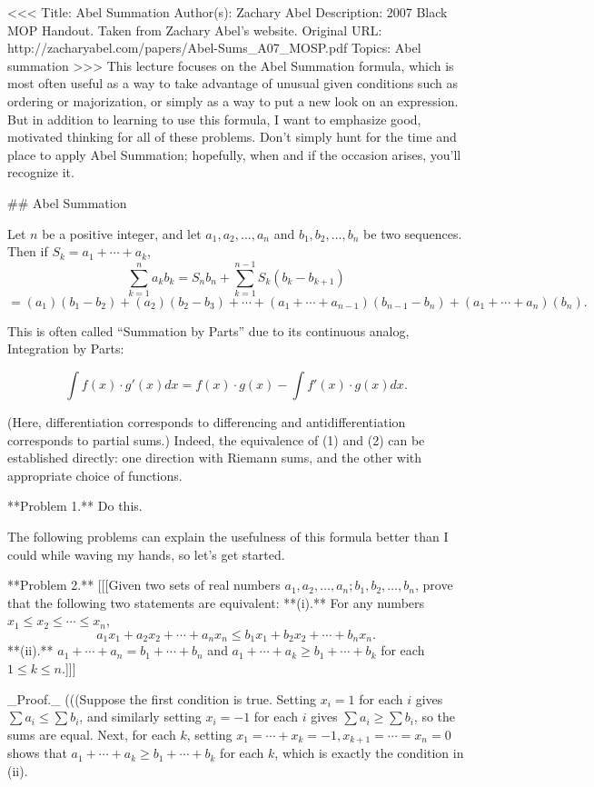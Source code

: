 <<<
Title: Abel Summation
Author(s): Zachary Abel
Description: 2007 Black MOP Handout. Taken from Zachary Abel's website. Original URL: http://zacharyabel.com/papers/Abel-Sums_A07_MOSP.pdf
Topics: Abel summation
>>>
This lecture focuses on the Abel Summation formula, which is most often useful as a way to take advantage
of unusual given conditions such as ordering or majorization, or simply as a way to put a new look on an
expression. But in addition to learning to use this formula, I want to emphasize good, motivated thinking
for all of these problems. Don’t simply hunt for the time and place to apply Abel Summation; hopefully,
when and if the occasion arises, you’ll recognize it.

## Abel Summation

Let $n$ be a positive integer, and let $a_1, a_2, \ldots, a_n$ and $b_1, b_2, \ldots, b_n$ be two sequences. Then if $S_k = a_1 + \cdots + a_k$, 
\[ \sum_{k=1}^n a_k b_k = S_n b_n + \sum_{k=1}^{n-1} S_k (b_k - b_{k+1}) \]
\[ = (a_1) (b_1 - b_2) + (a_2)(b_2 - b_3) + \cdots + (a_1 + \cdots + a_{n-1})(b_{n-1} - b_n) + (a_1 + \cdots + a_n)(b_n). \]

This is often called “Summation by Parts” due to its continuous analog, Integration by Parts:

\[ \int f(x) \cdot g'(x) dx = f(x) \cdot g(x) - \int f'(x) \cdot g(x) dx. \]

(Here, differentiation corresponds to differencing and antidifferentiation corresponds to partial sums.) Indeed, the equivalence of (1) and (2) can be established directly: one direction with Riemann sums, and the other with appropriate choice of functions.

**Problem 1.** Do this. 

The following problems can explain the usefulness of this formula better than I could while waving my
hands, so let’s get started.

**Problem 2.** [[[Given two sets of real numbers $a_1, a_2, \ldots, a_n; b_1, b_2, \ldots, b_n$, prove that the following two statements are equivalent:  
**(i).** For any numbers $x_1 \leq x_2 \leq \cdots \leq x_n$,  
\[ a_1 x_1 + a_2 x_2 + \cdots + a_n x_n \leq b_1 x_1 + b_2 x_2 + \cdots + b_n x_n. \]
**(ii).** $a_1 + \cdots + a_n = b_1 + \cdots + b_n$ and $a_1 + \cdots + a_k \geq b_1 + \cdots + b_k$ for each $1 \leq k \leq n$.]]]

_Proof._ (((Suppose the first condition is true. Setting $x_i = 1$ for each $i$ gives $\sum a_i \leq \sum b_i$, and similarly setting $x_i = -1$ for each $i$ gives $\sum a_i \geq \sum b_i$, so the sums are equal. Next, for each $k$, setting $x_1 = \cdots + x_k = -1, x_{k+1} = \cdots = x_n = 0$ shows that $a_1 + \cdots + a_k \geq b_1 + \cdots + b_k$ for each $k$, which is exactly the condition in (ii). 

